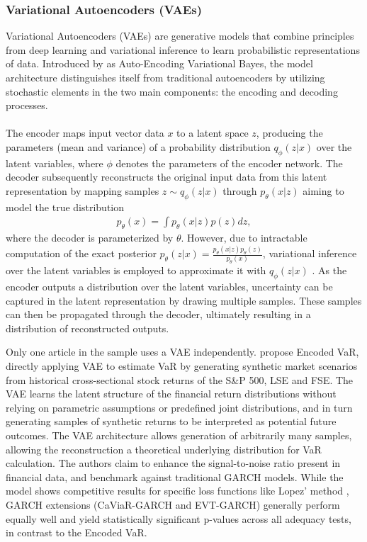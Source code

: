 \subsubsection{Variational Autoencoders (VAEs)}
Variational Autoencoders (VAEs) are generative models that combine principles from deep learning and variational inference to learn probabilistic representations of data. Introduced by \textcite{kingma2013auto} as Auto-Encoding Variational Bayes, the model architecture distinguishes itself from traditional autoencoders by utilizing stochastic elements in the two main components: the encoding and decoding processes. 
\\
\\The encoder maps input vector data $x$ to a latent space $z$, producing the parameters (mean and variance) of a probability distribution $q_\phi(z|x)$ over the latent variables, where $\phi$ denotes the parameters of the encoder network. The decoder subsequently reconstructs the original input data from this latent representation by mapping samples $z \sim q_\phi(z|x)$ through $p_{\theta}(x|z)$ aiming to model the true distribution
\begin{equation}
    \begin{gathered}
        p_\theta(x) = \int p_\theta(x|z)p(z)dz,
    \end{gathered}
\end{equation}
where the decoder is parameterized by $\theta$. However, due to intractable computation of the exact posterior $p_{\theta}(z|x) = \frac{p_{\theta}(x|z) p_{\theta}(z)}{p_{\theta}(x)}$, variational inference over the latent variables is employed to approximate it with $q_\phi(z|x)$ \parencite{kingma2013auto}. As the encoder outputs a distribution over the latent variables, uncertainty can be captured in the latent representation by drawing multiple samples. These samples can then be propagated through the decoder, ultimately resulting in a distribution of reconstructed outputs. 


Only one article in the sample uses a VAE independently. \textcite{arian2022encoded} propose Encoded VaR, directly applying VAE to estimate VaR by generating synthetic market scenarios from historical cross-sectional stock returns of the S\&P 500, LSE and FSE. The VAE learns the latent structure of the financial return distributions without relying on parametric assumptions or predefined joint distributions, and in turn generating samples of synthetic returns to be interpreted as potential future outcomes. The VAE architecture allows generation of arbitrarily many samples, allowing the reconstruction a theoretical underlying distribution for VaR calculation. The authors claim to enhance the signal-to-noise ratio present in financial data, and benchmark against traditional GARCH models. While the model shows competitive results for specific loss functions like Lopez' method \parencite{lopez1998methods}, GARCH extensions (CaViaR-GARCH and EVT-GARCH) generally perform equally well and yield statistically significant p-values across all adequacy tests, in contrast to the Encoded VaR. 

